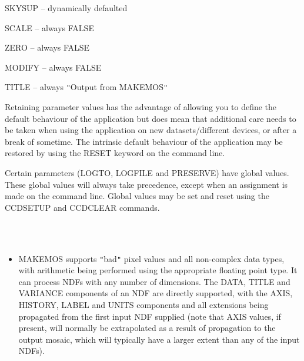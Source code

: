 \documentclass[twoside,11pt]{article}
\newcommand{\htmlref}[2]{#1}
\renewcommand{\_}{\texttt{\symbol{95}}}
\newcommand{\qt}[1]{{\tt "}#1{\tt "}}
\newcommand{\routine}[1]{{\sc #1}}
\newcommand{\xroutine}[1]{\htmlref{{\sc #1}}{#1}}
\newcommand{\sstimplementationstatus}[1]{
   \item[{Implementation Status:}] \mbox{} \\[1.3ex] #1}
\newcommand{\sstitemlist}[1]{
  \mbox{} \\
  \vspace{-3.5ex}
  \begin{itemize}
     #1
  \end{itemize}
}
\newcommand{\sstitem}{\item}
\newcommand{\sstimplementationstatus}[1]{
      \item[Implementation Status:] #1
   }
\newcommand{\sstitemlist}[1]{
      \begin{itemize}
         #1
      \end{itemize}
      \\
   }
\newcommand{\sstitem}{\item}
\begin{document}
{{{         \sstitem
            SKYSUP  -- dynamically defaulted

         \sstitem
            SCALE   -- always FALSE

         \sstitem
            ZERO    -- always FALSE

         \sstitem
            MODIFY  -- always FALSE

         \sstitem
            TITLE   -- always \qt{Output from MAKEMOS}

      }
      Retaining parameter values has the advantage of allowing you to
      define the default behaviour of the application but does mean
      that additional care needs to be taken when using the application
      on new datasets/different devices, or after a break of sometime.
      The intrinsic default behaviour of the application may be
      restored by using the RESET keyword on the command line.

      Certain parameters (LOGTO, LOGFILE and PRESERVE) have global
      values. These global values will always take precedence, except
      when an assignment is made on the command line. Global values may
      be set and reset using the \xroutine{CCDSETUP} and \xroutine{CCDCLEAR} commands.
   }
   \sstimplementationstatus{
      \sstitemlist{

         \sstitem
         \routine{MAKEMOS} supports \qt{bad} pixel values and all non-complex data
           types, with arithmetic being performed using the appropriate
           floating point type. It can process NDFs with any number of
           dimensions. The DATA, TITLE and VARIANCE components of an NDF
           are directly supported, with the AXIS, HISTORY, LABEL 
           and UNITS components and all extensions being propagated from
           the first input NDF supplied (note that AXIS values, if
           present, will normally be extrapolated as a result of
           propagation to the output mosaic, which will typically have a
           larger extent than any of the input NDFs).
      }
   }
}
\end{document}
